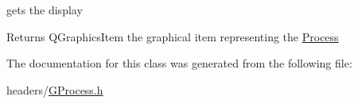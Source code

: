 gets the display 

\begin{DoxyReturn}{\-Returns}
\-Q\-Graphics\-Item the graphical item representing the \hyperlink{class_process}{\-Process} 
\end{DoxyReturn}


\-The documentation for this class was generated from the following file\-:\begin{DoxyCompactItemize}
\item 
headers/\hyperlink{_g_process_8h}{\-G\-Process.\-h}\end{DoxyCompactItemize}
